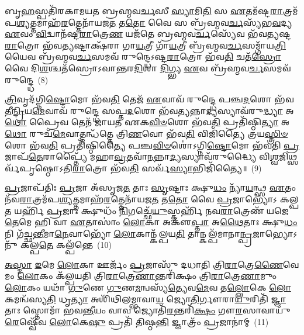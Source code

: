 {\anuvakamend[{𑌤𑍇𑌜᳴ 𑌉\-\ul{𑌪𑍇}\-𑌯𑍁𑌃 \ul{𑌪𑍍𑌰}\-𑌤𑍍𑌯\-\ul{𑌕𑍍𑌷𑌂} 𑌦𑍍𑌵𑌿𑌚᳴𑌤𑍍𑌵𑌾𑌰𑌿𑍞𑌶𑌚𑍍𑌚}]}%

𑌬𑍃\-\ul{𑌹}\-𑌸𑍍𑌪𑌤𑌿᳴𑌰𑌕𑌾𑌮𑌯𑌤 𑌬𑍍𑌰𑌹𑍍𑌮𑌵\-\ul{𑌰𑍍𑌚}\-𑌸𑍀 \ul{𑌸𑍍𑌯𑌾}\-𑌮𑌿\-\ul{𑌤𑌿} 𑌸 \ul{𑌏}\-𑌤𑌮᳴𑌷𑍍𑌟\-\ul{𑌰𑌾}\-𑌤𑍍𑌰𑌮᳴𑌪\-\ul{𑌶𑍍𑌯}\-𑌤𑍍𑌤𑌮𑌾𑌹᳴\-\ul{𑌰}\-𑌤𑍍𑌤𑍇𑌨𑌾᳴𑌯𑌜\-\ul{𑌤} 𑌤\-\ul{𑌤𑍋} 𑌵𑍈 𑌸 𑌬𑍍𑌰᳴𑌹𑍍𑌮𑌵\-\ul{𑌰𑍍𑌚}\-𑌸𑍍𑌯᳴𑌭\-\ul{𑌵}\-𑌦𑍍𑌯 \ul{𑌏}\-𑌵𑌂 \ul{𑌵𑌿}\-𑌦𑍍𑌵𑌾𑌨᳴𑌷𑍍𑌟\-\ul{𑌰𑌾}\-𑌤𑍍𑌰𑍇\-\ul{𑌣} 𑌯𑌜᳴𑌤𑍇 𑌬𑍍𑌰𑌹𑍍𑌮𑌵\-\ul{𑌰𑍍𑌚}\-𑌸𑍍𑌯𑍇᳴𑌵 𑌭᳴𑌵𑌤𑍍𑌯𑌷𑍍𑌟\-\ul{𑌰𑌾}\-𑌤𑍍𑌰𑍋 𑌭᳴𑌵\-\ul{𑌤𑍍𑌯}\-𑌷𑍍𑌟𑌾𑌕𑍍𑌷᳴𑌰𑌾 𑌗𑌾\-\ul{𑌯}\-𑌤𑍍𑌰𑍀 𑌗𑌾᳴\-\ul{𑌯}\-𑌤𑍍𑌰𑍀 𑌬𑍍𑌰᳴𑌹𑍍𑌮𑌵\-\ul{𑌰𑍍𑌚}\-𑌸𑌮𑍍𑌗𑌾᳴𑌯\-\ul{𑌤𑍍𑌰𑌿}\-𑌯𑍈𑌵 𑌬𑍍𑌰᳴𑌹𑍍𑌮𑌵\-\ul{𑌰𑍍𑌚}\-𑌸𑌮𑌵᳴ 𑌰𑍁𑌨𑍍𑌦𑍍𑌧𑍇\-𑌽𑌷𑍍𑌟\-\ul{𑌰𑌾}\-𑌤𑍍𑌰𑍋 𑌭᳴𑌵\-\ul{𑌤𑌿} 𑌚𑌤᳴\-\ul{𑌸𑍍𑌰𑍋} 𑌵𑍈 𑌦𑌿\-\ul{𑌶}\-𑌶𑍍𑌚𑌤᳴𑌸𑍍𑌰𑍋\-𑌽𑌵𑌾𑌨𑍍𑌤𑌰\-\ul{𑌦𑌿}\-𑌶𑌾 \ul{𑌦𑌿}\-𑌗𑍍𑌭𑍍𑌯 \ul{𑌏}\-𑌵 𑌬𑍍𑌰᳴𑌹𑍍𑌮𑌵\-\ul{𑌰𑍍𑌚}\-𑌸𑌮𑌵᳴ 𑌰𑍁𑌨𑍍𑌦𑍍𑌧𑍇~(8)

\-\ul{𑌤𑍍𑌰𑌿}\-𑌵𑍃𑌦᳴𑌗𑍍𑌨𑌿\-\ul{𑌷𑍍𑌟𑍋}\-𑌮𑍋 𑌭᳴𑌵\-\ul{𑌤𑌿} 𑌤𑍇𑌜᳴ \ul{𑌏}\-𑌵𑌾𑌵᳴ 𑌰𑍁𑌨𑍍𑌦𑍍𑌧𑍇 𑌪𑌞𑍍𑌚\-\ul{𑌦}\-𑌶𑍋 𑌭᳴𑌵𑌤𑍀\-\ul{𑌨𑍍𑌦𑍍𑌰𑌿}\-𑌯\-\ul{𑌮𑍇}\-𑌵𑌾𑌵᳴ 𑌰𑍁𑌨𑍍𑌦𑍍𑌧𑍇 𑌸𑌪𑍍𑌤\-\ul{𑌦}\-𑌶𑍋 𑌭᳴𑌵\-\ul{𑌤𑍍𑌯}\-𑌨𑍍𑌨𑌾\-\ul{𑌦𑍍𑌯}\-𑌸𑍍𑌯𑌾𑌵᳴𑌰𑍁\-\ul{𑌦𑍍𑌧𑍍𑌯𑌾} 𑌅\-\ul{𑌥𑍋} 𑌪𑍍𑌰𑍈𑌵 𑌤𑍇𑌨᳴ 𑌜𑌾𑌯𑌤 𑌏𑌕\-\ul{𑌵𑌿}\-\-\ul{𑍞}\-𑌶𑍋 𑌭᳴𑌵\-\ul{𑌤𑌿} 𑌪𑍍𑌰𑌤𑌿᳴𑌷𑍍𑌠𑌿\-\ul{𑌤𑍍𑌯𑌾} 𑌅\-\ul{𑌥𑍋} 𑌰𑍁𑌚᳴\-\ul{𑌮𑍇}\-𑌵𑌾𑌤𑍍𑌮𑌨𑍍𑌧᳴𑌤𑍍𑌤𑍇 𑌤𑍍𑌰𑌿\-\ul{𑌣}\-𑌵𑍋 𑌭᳴𑌵\-\ul{𑌤𑌿} 𑌵𑌿𑌜𑌿᳴𑌤𑍍𑌯𑍈 𑌤𑍍𑌰𑌯\-\ul{𑌸𑍍𑌤𑍍𑌰𑌿}\-\-\ul{𑍞}\-𑌶𑍋 𑌭᳴𑌵\-\ul{𑌤𑌿} 𑌪𑍍𑌰𑌤𑌿᳴𑌷𑍍𑌠𑌿𑌤𑍍𑌯𑍈 𑌪𑌞𑍍𑌚\-\ul{𑌵𑌿}\-\-\ul{𑍞}\-𑌶𑍋॑\-𑌽𑌗𑍍𑌨𑌿\-\ul{𑌷𑍍𑌟𑍋}\-𑌮𑍋 𑌭᳴𑌵𑌤𑌿 \ul{𑌪𑍍𑌰}\-𑌜𑌾𑌪᳴\-\ul{𑌤𑍇}\-𑌰𑌾𑌪𑍍𑌤𑍍𑌯𑍈᳴ 𑌮𑌹𑌾\-\ul{𑌵𑍍𑌰}\-𑌤𑌵𑌾᳴\-\ul{𑌨}\-𑌨𑍍𑌨𑌾\-\ul{𑌦𑍍𑌯}\-𑌸𑍍𑌯𑌾𑌵᳴𑌰𑍁𑌦𑍍𑌧𑍍𑌯𑍈 𑌵𑌿\-\ul{𑌶𑍍𑌵}\-𑌜𑌿𑌥𑍍𑌸𑌰𑍍𑌵᳴𑌪𑍃𑌷𑍍𑌠𑍋\-𑌽𑌤𑌿\-\ul{𑌰𑌾}\-𑌤𑍍𑌰𑍋 𑌭᳴𑌵\-\ul{𑌤𑌿} 𑌸𑌰𑍍𑌵᳴\-\ul{𑌸𑍍𑌯𑌾}\-𑌭𑌿𑌜𑌿᳴𑌤𑍍𑌯𑍈॥~(9)

{\anuvakamend[{\-\ul{𑌦𑌿}\-𑌗𑍍𑌭𑍍𑌯 \ul{𑌏}\-𑌵 𑌬𑍍𑌰᳴𑌹𑍍𑌮𑌵\-\ul{𑌰𑍍𑌚}\-𑌸𑌮𑌵᳴\-𑌰𑍁\-\ul{𑌨𑍍𑌧𑍇}\-\-𑌽𑌭𑌿𑌜𑌿᳴𑌤𑍍𑌯𑍈}]}%

\-\ul{𑌪𑍍𑌰}\-𑌜𑌾𑌪᳴𑌤𑌿𑌃 \ul{𑌪𑍍𑌰}\-𑌜𑌾 𑌅᳴𑌸𑍃𑌜\-\ul{𑌤} 𑌤𑌾𑌃 \ul{𑌸𑍃}\-𑌷𑍍𑌟𑌾𑌃 𑌕𑍍𑌷𑍁\-\ul{𑌧𑌂} 𑌨𑍍𑌯𑌾᳴\-\ul{𑌯}\-𑌨𑍍𑌥𑍍𑌸 \ul{𑌏}\-𑌤𑌂 𑌨᳴𑌵\-\ul{𑌰𑌾}\-𑌤𑍍𑌰𑌮᳴𑌪\-\ul{𑌶𑍍𑌯}\-𑌤𑍍𑌤𑌮𑌾𑌹᳴\-\ul{𑌰}\-𑌤𑍍𑌤𑍇𑌨𑌾᳴𑌯𑌜\-\ul{𑌤} 𑌤\-\ul{𑌤𑍋} 𑌵𑍈 \ul{𑌪𑍍𑌰}\-𑌜𑌾𑌭𑍍𑌯𑍋᳴\-𑌽 𑌕𑌲𑍍𑌪\-\ul{𑌤} 𑌯𑌰𑍍\mbox{}𑌹𑌿᳴ \ul{𑌪𑍍𑌰}\-𑌜𑌾𑌃 𑌕𑍍𑌷𑍁𑌧𑌂᳴ \ul{𑌨𑌿}\-𑌗𑌚𑍍𑌛𑍇᳴\-\ul{𑌯𑍁}\-𑌸𑍍𑌤𑌰𑍍\mbox{}𑌹𑌿᳴ 𑌨𑌵\-\ul{𑌰𑌾}\-𑌤𑍍𑌰𑍇𑌣᳴ 𑌯𑌜𑍇\-\ul{𑌤𑍇}\-𑌮𑍇 𑌹𑌿 𑌵𑌾 \ul{𑌏}\-𑌤𑌾𑌸𑌾𑌂॑ \ul{𑌲𑍋}\-𑌕𑌾 𑌅𑌕𑍢᳴\-\ul{𑌪𑍍𑌤𑌾} 𑌅\-\ul{𑌥𑍈}\-𑌤𑌾𑌃 𑌕𑍍𑌷𑍁\-\ul{𑌧𑌂} 𑌨𑌿 𑌗᳴𑌚𑍍𑌛\-\ul{𑌨𑍍𑌤𑍀}\-𑌮𑌾\-\ul{𑌨𑍇}\-𑌵𑌾𑌭𑍍𑌯𑍋᳴ \ul{𑌲𑍋}\-𑌕𑌾𑌨𑍍𑌕᳴𑌲𑍍𑌪𑌯\-\ul{𑌤𑌿} 𑌤𑌾𑌨𑍍𑌕𑌲𑍍𑌪᳴𑌮𑌾𑌨𑌾\-\ul{𑌨𑍍𑌪𑍍𑌰}\-𑌜𑌾𑌭𑍍𑌯𑍋\-𑌽𑌨𑍁᳴ 𑌕𑌲𑍍𑌪\-\ul{𑌤𑍇} 𑌕𑌲𑍍𑌪᳴𑌨𑍍𑌤𑍇~(10)

\-\ul{𑌅}\-\-\ul{𑌸𑍍𑌮𑌾} \ul{𑌇}\-𑌮𑍇 \ul{𑌲𑍋}\-𑌕𑌾 𑌊𑌰𑍍𑌜𑌂᳴ \ul{𑌪𑍍𑌰}\-𑌜𑌾𑌸𑍁᳴ 𑌦𑌧𑌾𑌤𑌿 𑌤𑍍𑌰𑌿\-\ul{𑌰𑌾}\-𑌤𑍍𑌰𑍇\-\ul{𑌣𑍈}\-𑌵𑍇𑌮𑌂 \ul{𑌲𑍋}\-𑌕𑌂 𑌕᳴𑌲𑍍𑌪𑌯𑌤𑌿 𑌤𑍍𑌰𑌿\-\ul{𑌰𑌾}\-𑌤𑍍𑌰𑍇\-\ul{𑌣𑌾}\-𑌨𑍍𑌤𑌰𑌿᳴𑌕𑍍𑌷𑌂 𑌤𑍍𑌰𑌿\-\ul{𑌰𑌾}\-𑌤𑍍𑌰𑍇\-\ul{𑌣𑌾}\-𑌮𑍁𑌂 \ul{𑌲𑍋}\-𑌕𑌂 𑌯𑌥𑌾᳴ \ul{𑌗𑍁}\-𑌣𑍇 \ul{𑌗𑍁}\-𑌣\-\ul{𑌮}\-𑌨𑍍𑌵𑌸𑍍𑌯᳴\-\ul{𑌤𑍍𑌯𑍇}\-𑌵\-\ul{𑌮𑍇}\-𑌵 𑌤\-\ul{𑌲𑍍𑌲𑍋}\-𑌕𑍇 \ul{𑌲𑍋}\-𑌕𑌮𑌨𑍍𑌵᳴𑌸𑍍𑌯\-\ul{𑌤𑌿} 𑌧𑍃\-\ul{𑌤𑍍𑌯𑌾} 𑌅𑌶𑌿᳴𑌥𑌿𑌲𑌮𑍍𑌭𑌾𑌵𑌾\-\ul{𑌯} 𑌜𑍍𑌯𑍋\-\ul{𑌤𑌿}\-𑌰𑍍𑌗𑍗𑌰𑌾\-\ul{𑌯𑍁}\-𑌰𑌿𑌤𑌿᳴ \ul{𑌜𑍍𑌞𑌾}\-𑌤𑌾𑌃 𑌸𑍍𑌤𑍋𑌮𑌾᳴ 𑌭𑌵\-\ul{𑌨𑍍𑌤𑍀}\-𑌯𑌂 𑌵𑌾𑌵 𑌜𑍍𑌯𑍋𑌤𑌿᳴\-\ul{𑌰}\-𑌨𑍍𑌤𑌰𑌿᳴\-\ul{𑌕𑍍𑌷𑌂} 𑌗𑍗\-\ul{𑌰}\-𑌸𑌾𑌵𑌾𑌯𑍁᳴\-\ul{𑌰𑍇}\-𑌷𑍍𑌵𑍇᳴𑌵 \ul{𑌲𑍋}\-𑌕𑍇\-\ul{𑌷𑍁} 𑌪𑍍𑌰𑌤𑌿᳴ 𑌤𑌿𑌷𑍍𑌠\-\ul{𑌨𑍍𑌤𑌿} 𑌜𑍍𑌞𑌾𑌤𑍍𑌰𑌂᳴ \ul{𑌪𑍍𑌰}\-𑌜𑌾𑌨𑌾॑𑌮𑍍~(11)

